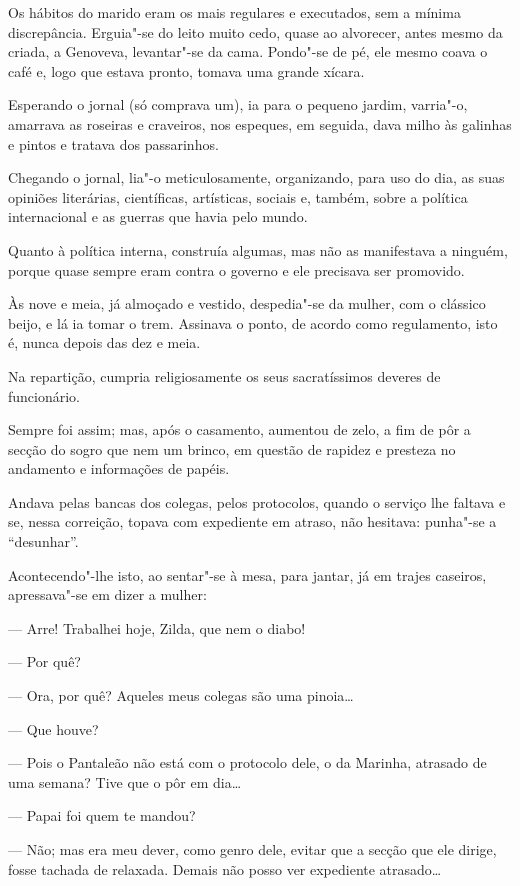 Os hábitos do marido eram os mais regulares e executados, sem a mínima
discrepância. Erguia"-se do leito muito cedo, quase ao alvorecer, antes
mesmo da criada, a Genoveva, levantar"-se da cama. Pondo"-se de pé, ele
mesmo coava o café e, logo que estava pronto, tomava uma grande xícara.

Esperando o jornal (só comprava um), ia para o pequeno jardim, varria"-o,
amarrava as roseiras e craveiros, nos espeques, em seguida, dava milho
às galinhas e pintos e tratava dos passarinhos.

Chegando o jornal, lia"-o meticulosamente, organizando, para uso do dia,
as suas opiniões literárias, científicas, artísticas, sociais e, também,
sobre a política internacional e as guerras que havia pelo mundo.

Quanto à política interna, construía algumas, mas não as manifestava a
ninguém, porque quase sempre eram contra o governo e ele precisava ser
promovido.

Às nove e meia, já almoçado e vestido, despedia"-se da mulher, com o
clássico beijo, e lá ia tomar o trem. Assinava o ponto, de acordo como
regulamento, isto é, nunca depois das dez e meia.

Na repartição, cumpria religiosamente os seus sacratíssimos deveres de
funcionário.

Sempre foi assim; mas, após o casamento, aumentou de zelo, a fim de pôr
a secção do sogro que nem um brinco, em questão de rapidez e presteza no
andamento e informações de papéis.

Andava pelas bancas dos colegas, pelos protocolos, quando o serviço lhe
faltava e se, nessa correição, topava com expediente em atraso, não
hesitava: punha"-se a ``desunhar''.

Acontecendo"-lhe isto, ao sentar"-se à mesa, para jantar, já em trajes
caseiros, apressava"-se em dizer a mulher:

--- Arre! Trabalhei hoje, Zilda, que nem o diabo!

--- Por quê?

--- Ora, por quê? Aqueles meus colegas são uma pinoia\ldots{}

--- Que houve?

--- Pois o Pantaleão não está com o protocolo dele, o da Marinha,
atrasado de uma semana? Tive que o pôr em dia\ldots{}

--- Papai foi quem te mandou?

--- Não; mas era meu dever, como genro dele, evitar que a secção que ele
dirige, fosse tachada de relaxada. Demais não posso ver expediente
atrasado\ldots{}

